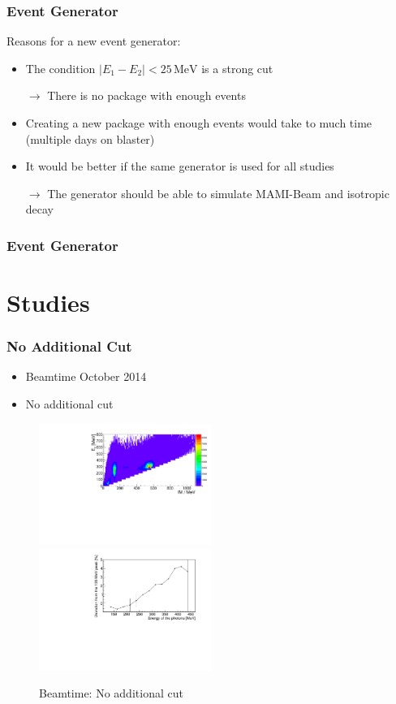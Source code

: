 \documentclass[slidestop,compress,mathserif]{beamer}
\begin{document}
\begin{frame}
\frametitle{Event Generator}
Reasons for a new event generator:
\pause
\begin{itemize}
	\item The condition $|E_1 - E_2|<25\,\text{MeV}$ is a strong cut 
	
	$\rightarrow$ There is no package with enough events
	\pause
	
	\item Creating a new package with enough events would take to much time (multiple days on blaster)
	\pause
	
	\item It would be better if the same generator is used for all studies
	
	$\rightarrow$ The generator should be able to simulate MAMI-Beam and isotropic decay 
\end{itemize}
\end{frame}

\begin{frame}
	\frametitle{Event Generator}
\end{frame}
\section{Studies}


\begin{frame}
	\frametitle{No Additional Cut }
	
	\begin{itemize}
		\item Beamtime October 2014
		\item No additional cut
\end{itemize}
	
		\begin{figure}
		
		\includegraphics[width=0.50\textwidth]{Pictures/20171904Uncharged2DHist}
		\hfill
		\includegraphics[width=0.50\textwidth]{Pictures/20170405StrahlzeitDeviatoinNoCut}
		\caption{Beamtime: No additional cut}
	\end{figure}	
\end{frame}
\end{document}
